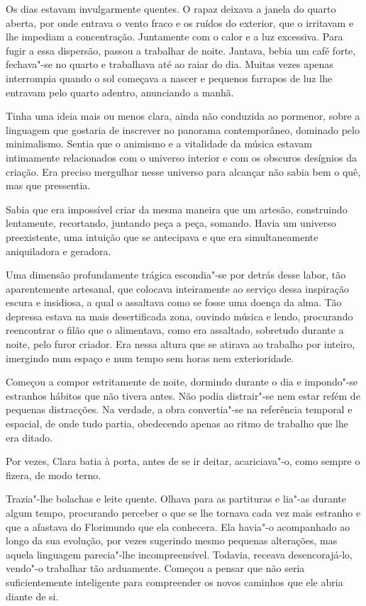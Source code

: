 Os dias estavam invulgarmente quentes. O rapaz deixava a janela do
quarto aberta, por onde entrava o vento fraco e os ruídos do exterior,
que o irritavam e lhe impediam a concentração. Juntamente com o calor e
a luz excessiva. Para fugir a essa dispersão, passou a trabalhar de
noite. Jantava, bebia um café forte, fechava"-se no quarto e trabalhava
até ao raiar do dia. Muitas vezes apenas interrompia quando o sol
começava a nascer e pequenos farrapos de luz lhe entravam pelo quarto
adentro, anunciando a manhã.

Tinha uma ideia mais ou menos clara, ainda não conduzida ao pormenor,
sobre a linguagem que gostaria de inscrever no panorama contemporâneo,
dominado pelo minimalismo. Sentia que o animismo e a vitalidade da
música estavam intimamente relacionados com o universo interior e com os
obscuros desígnios da criação. Era preciso mergulhar nesse universo para
alcançar não sabia bem o quê, mas que pressentia.

Sabia que era impossível criar da mesma maneira que um artesão,
construindo lentamente, recortando, juntando peça a peça, somando. Havia
um universo preexistente, uma intuição que se antecipava e que era
simultaneamente aniquiladora e geradora.

Uma dimensão profundamente trágica escondia"-se por detrás desse labor,
tão aparentemente artesanal, que colocava inteiramente ao serviço dessa
inspiração escura e insidiosa, a qual o assaltava como se fosse uma
doença da alma. Tão depressa estava na mais desertificada zona, ouvindo
música e lendo, procurando reencontrar o filão que o alimentava, como
era assaltado, sobretudo durante a noite, pelo furor criador. Era nessa
altura que se atirava ao trabalho por inteiro, imergindo num espaço e
num tempo sem horas nem exterioridade.

Começou a compor estritamente de noite, dormindo durante o dia e
impondo"-se estranhos hábitos que não tivera antes. Não podia distrair"-se
nem estar refém de pequenas distracções. Na verdade, a obra convertia"-se
na referência temporal e espacial, de onde tudo partia, obedecendo
apenas ao ritmo de trabalho que lhe era ditado.

Por vezes, Clara batia à porta, antes de se ir deitar, acariciava"-o,
como sempre o fizera, de modo terno.

Trazia"-lhe bolachas e leite quente. Olhava para as partituras e lia"-as
durante algum tempo, procurando perceber o que se lhe tornava cada vez
mais estranho e que a afastava do Florimundo que ela conhecera. Ela
havia"-o acompanhado ao longo da sua evolução, por vezes sugerindo mesmo
pequenas alterações, mas aquela linguagem parecia"-lhe incompreensível.
Todavia, receava desencorajá-lo, vendo"-o trabalhar tão arduamente.
Começou a pensar que não seria suficientemente inteligente para
compreender os novos caminhos que ele abria diante de si.

